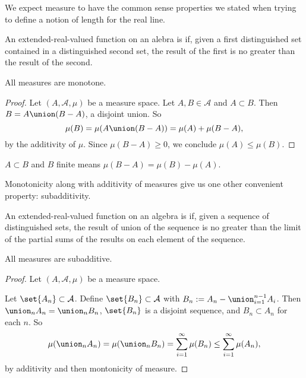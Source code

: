 
\sbasic



\sstart



We expect measure to have the
common sense properties we stated
when trying to define a notion of
length for the real line.


An extended-real-valued function on an
alebra is
if, given a first distinguished set contained in
a distinguished second set, the result of the
first is no greater than the result of the second.

\begin{prop}
  All measures are monotone.
  \begin{proof}
    Let $(A, \mathcal{A}, \mu)$ be
    a measure space.
    Let $A, B \in \mathcal{A}$
    and $A \subset B$.
    Then $B = A \union (B - A)$,
    a disjoint union.
    So
    \[
      \mu(B) = \mu(A \union (B - A))= \mu(A) + \mu(B - A),
    \]
    by the additivity of $\mu$.
    Since $\mu(B - A) \geq 0$,
    we conclude $\mu(A) \leq \mu(B)$.
  \end{proof}
\end{prop}

\begin{prop}
  $A \subset B$ and $B$ finite
  means $\mu(B - A) = \mu(B) - \mu(A)$.
\end{prop}



Monotonicity along with additivity of
measures give us one other convenient
property: subadditivity.

An extended-real-valued function on an algebra is
if, given a sequence of distinguished sets, the
result of union of the sequence is no greater than
the limit of the partial sums of the results on
each element of the sequence.

\begin{prop}
  All measures are subadditive.
  \begin{proof}
    Let $(A, \mathcal{A}, \mu)$ be a measure space.

    Let $\set{A_n} \subset \mathcal{A}$.
    Define $\set{B_n} \subset \mathcal{A}$
    with $B_n := A_n - \union_{i = 1}^{n-1} A_i$.
    Then
    $\union_n A_n = \union_n B_n$,
    $\set{B_n}$ is a disjoint sequence, and
    $B_n \subset A_n$ for each $n$.
    So
    \[
      \mu(\union_{n} A_n) = \mu(\union_{n} B_n) = \sum_{i = 1}^{\infty} \mu(B_n) \leq \sum_{i = 1}^{\infty} \mu(A_n),
    \]
    by additivity and then montonicity of measure.
  \end{proof}

\end{prop}

